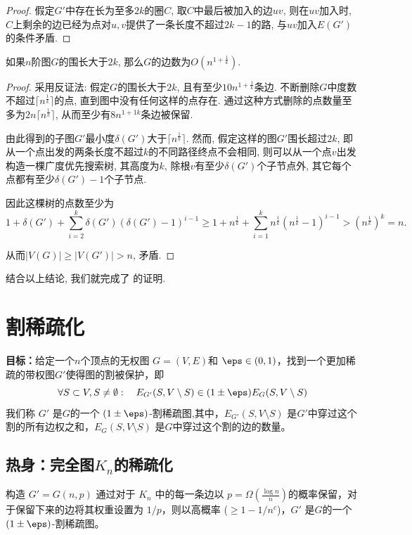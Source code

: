 \begin{proof}
    假定$G'$中存在长为至多$2k$的圈$C$, 取$C$中最后被加入的边$uv$, 则在$uv$加入时, $C$上剩余的边已经为点对$u,v$提供了一条长度不超过$2k-1$的路, 与$uv$加入$E(G')$的条件矛盾.
\end{proof}

\begin{claim}
    如果$n$阶图$G$的围长大于$2k$, 那么$G$的边数为$O(n^{1+\frac{1}{k}})$.
\end{claim}

\begin{proof}
    采用反证法: 假定$G$的围长大于$2k$, 且有至少$10n^{1+\frac{1}{k}}$条边. 不断删除$G$中度数不超过$\lceil n^\frac{1}{k}\rceil$的点, 直到图中没有任何这样的点存在. 通过这种方式删除的点数量至多为$2n\lceil n^\frac{1}{k}\rceil$, 从而至少有$8n^{1+{1}{k}}$条边被保留.

    由此得到的子图$G'$最小度$\delta(G')$大于$\lceil n^{\frac{1}{k}}\rceil$. 然而, 假定这样的图$G'$围长超过$2k$, 即从一个点出发的两条长度不超过$k$的不同路径终点不会相同, 则可以从一个点$v$出发构造一棵广度优先搜索树, 其高度为$k$, 除根$v$有至少$\delta(G')$个子节点外, 其它每个点都有至少$\delta(G
    ')-1$个子节点.

    因此这棵树的点数至少为
    \[
    1+\delta(G')+\sum_{i=2}^k \delta(G')(\delta(G')-1)^{i-1}\geq1+n^{
    \frac{1}{k}}+\sum_{i=1}^k n^{
    \frac{1}{k}}(n^{
    \frac{1}{k}}-1)^{i-1}>(n^{\frac{1}{k}})^k=n.
    \]
    
    从而$|V(G)|\geq|V(G')|>n$, 矛盾.
\end{proof}

结合以上结论, 我们就完成了  的证明.




\section{割稀疏化}
\textbf{目标：}给定一个$n$个顶点的无权图 $G=(V,E)$和 $\eps\in(0,1)$，找到一个更加稀疏的带权图$G'$使得图的割被保护，即
\[
\forall S\subset V,S\neq \emptyset:\quad E_{G'}(S,V\setminus S)\in(1\pm\eps) E_G(S,V\setminus S)
\]
我们称 $G'$ 是$G$的一个 $(1\pm\eps)$-割稀疏图,其中，$E_{G'}(S,V\setminus S)$ 是$G'$中穿过这个割的所有边权之和，$E_{G}(S,V\setminus S)$ 是$G$中穿过这个割的边的数量。

\subsection{热身：完全图$K_n$的稀疏化}
构造 $G'=G(n,p)$ 通过对于 $K_n$ 中的每一条边以 $p=\Omega(\frac{\log n}{n})$的概率保留，对于保留下来的边将其权重设置为 $1/p$，则以高概率 ($\geq 1-1/n^c$)，$G'$ 是$G$的一个 $(1\pm\eps)$-割稀疏图。

